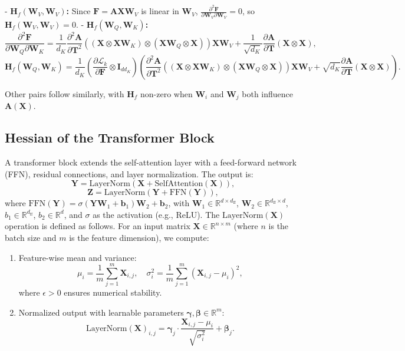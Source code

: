 \documentclass{article}
\begin{document}
- \textbf{\(\mathbf{H}_f(\mathbf{W}_V, \mathbf{W}_V)\):} Since \(\mathbf{F} = \mathbf{A} \mathbf{X} \mathbf{W}_V\) is linear in \(\mathbf{W}_V\), \(\frac{\partial^2 \mathbf{F}}{\partial \mathbf{W}_V \partial \mathbf{W}_V} = 0\), so \(\mathbf{H}_f(\mathbf{W}_V, \mathbf{W}_V) = 0\).
- \textbf{\(\mathbf{H}_f(\mathbf{W}_Q, \mathbf{W}_K)\):} 
\[
\frac{\partial^2 \mathbf{F}}{\partial \mathbf{W}_Q \partial \mathbf{W}_K} = \frac{1}{d_K} \frac{\partial^2 \mathbf{A}}{\partial \mathbf{T}^2} \left( (\mathbf{X} \otimes \mathbf{X} \mathbf{W}_K) \otimes (\mathbf{X} \mathbf{W}_Q \otimes \mathbf{X}) \right) \mathbf{X} \mathbf{W}_V + \frac{1}{\sqrt{d_K}} \frac{\partial \mathbf{A}}{\partial \mathbf{T}} (\mathbf{X} \otimes \mathbf{X}),
\]
\[
\mathbf{H}_f(\mathbf{W}_Q, \mathbf{W}_K) = \frac{1}{d_K} \left( \frac{\partial \mathcal{L}_k}{\partial \mathbf{F}} \otimes \mathbf{I}_{d d_K} \right) \left( \frac{\partial^2 \mathbf{A}}{\partial \mathbf{T}^2} \left( (\mathbf{X} \otimes \mathbf{X} \mathbf{W}_K) \otimes (\mathbf{X} \mathbf{W}_Q \otimes \mathbf{X}) \right) \mathbf{X} \mathbf{W}_V + \sqrt{d_K} \frac{\partial \mathbf{A}}{\partial \mathbf{T}} (\mathbf{X} \otimes \mathbf{X}) \right).
\]

Other pairs follow similarly, with \(\mathbf{H}_f\) non-zero when \(\mathbf{W}_i\) and \(\mathbf{W}_j\) both influence \(\mathbf{A}(\mathbf{X})\).

\subsection{Hessian of the Transformer Block}\label{subsec:hessian_transformer_block}

A transformer block extends the self-attention layer with a feed-forward network (FFN), residual connections, and layer normalization. The output is:
\[
\mathbf{Y} = \text{LayerNorm}(\mathbf{X} + \text{SelfAttention}(\mathbf{X})),
\]
\[
\mathbf{Z} = \text{LayerNorm}(\mathbf{Y} + \text{FFN}(\mathbf{Y})),
\]
where \( \text{FFN}(\mathbf{Y}) = \sigma(\mathbf{Y} \mathbf{W}_1 + \mathbf{b}_1) \mathbf{W}_2 + \mathbf{b}_2 \), with \( \mathbf{W}_1 \in \mathbb{R}^{d \times d_{\text{ff}}} \), \( \mathbf{W}_2 \in \mathbb{R}^{d_{\text{ff}} \times d} \), \( b_1 \in \mathbb{R}^{d_{\text{ff}}} \), \( b_2 \in \mathbb{R}^{d} \), and \( \sigma \) as the activation (e.g., ReLU). The $\text{LayerNorm}(\mathbf{X})$ operation is defined as follows. For an input matrix \(\mathbf{X} \in \mathbb{R}^{n \times m}\) (where \(n\) is the batch size and \(m\) is the feature dimension), we compute:
\begin{enumerate}
    \item Feature-wise mean and variance:
    \[
    \mu_i = \frac{1}{m} \sum_{j=1}^m \mathbf{X}_{i,j}, \quad \sigma_i^2 = \frac{1}{m} \sum_{j=1}^m (\mathbf{X}_{i,j} - \mu_i)^2,
    \]
    where \(\epsilon > 0\) ensures numerical stability.
    
    \item Normalized output with learnable parameters \(\mathbf{\gamma}, \mathbf{\beta} \in \mathbb{R}^m\):
    \[
    \text{LayerNorm}(\mathbf{X})_{i,j} = \mathbf{\gamma}_j \cdot \frac{\mathbf{X}_{i,j} - \mu_i}{\sqrt{\sigma_i^2}} + \mathbf{\beta}_j.
    \]
\end{enumerate}
\end{document}
